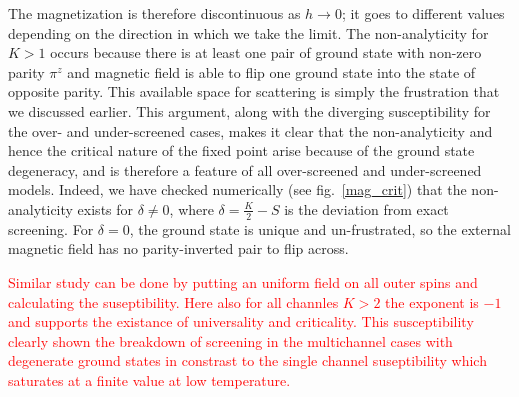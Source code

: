 \documentclass[reprint,prb,superscriptaddress]{revtex4-2}
\begin{document}
The magnetization is therefore discontinuous as \(h\to 0\); it goes to different values depending on the direction in which we take the limit. The non-analyticity for \(K>1\) occurs because there is at least one pair of ground state with non-zero parity \(\pi^z\) and magnetic field is able to flip one ground state into the state of opposite parity. This available space for scattering is simply the frustration that we discussed earlier. This argument, along with the diverging susceptibility for the over- and under-screened cases, makes it clear that {the non-analyticity and hence the critical nature of the fixed point arise because of the ground state degeneracy, and is therefore a feature of all over-screened and under-screened  models}. Indeed, we have checked numerically (see fig.~\ref{mag_crit}) that the non-analyticity exists for \(\delta \neq 0\), where \(\delta = \frac{K}{2} - S\) is the deviation from exact screening. For \(\delta=0\), the ground state is unique and un-frustrated, so the external magnetic field has no parity-inverted pair to flip across.

\textcolor{red}{Similar study can be done by putting an uniform field on all outer spins and calculating the suseptibility. Here also for all channles $K>2$ the exponent is $-1$ and supports the existance of universality and criticality.
This susceptibility clearly shown the breakdown of screening in the multichannel cases with degenerate ground states in constrast to the single channel suseptibility which saturates at a finite value at low temperature.}
\end{document}
